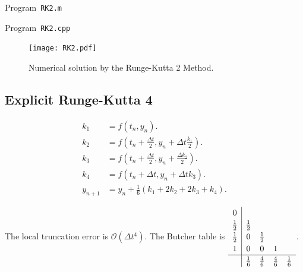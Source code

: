 \begin{listing}[ht!]
	\tiny
	\centering
	\caption{Program~\texttt{RK2.m}}
	\label{code:RK2.m}
\end{listing}

\begin{listing}[ht!]
	\tiny
	\centering
	\caption{Program~\texttt{RK2.cpp}}
	\label{code:RK2.cpp}
\end{listing}

\begin{figure}[ht!]
	\centering
	\texttt{[image: RK2.pdf]}
	\caption{Numerical solution by the Runge-Kutta 2 Method.}
\end{figure}

\subsection{Explicit Runge-Kutta 4}

\begin{align*}
	k_{1}   & =
	f\left(t_{n},y_{n}\right).                                            \\
	k_{2}   & =
	f\left(t_{n}+\frac{\Delta t}{2},y_{n}+\Delta t\frac{k_{1}}{2}\right). \\
	k_{3}   & =
	f\left(t_{n}+\frac{\Delta t}{2},y_{n}+\frac{\Delta k_{2}}{2}\right).  \\
	k_{4}   & =
	f\left(t_{n}+\Delta t,y_{n}+\Delta t k_{3}\right).                    \\
	y_{n+1} & =
	y_{n}+
	\frac{1}{6}\left(k_{1}+2k_{2}+2k_{3}+k_{4}\right).
\end{align*}

The local truncation error is
\begin{math}
	\mathcal{O}
	\left(\Delta t^{4}\right)
\end{math}.
The Butcher table is
\begin{math}
	\renewcommand\arraystretch{1.2}
	\begin{array}
		{c|cccc}
		0           &             &             &             &             \\
		\frac{1}{2} & \frac{1}{2} &             &             &             \\
		\frac{1}{2} & 0           & \frac{1}{2} &             &             \\
		1           & 0           & 0           & 1           &             \\
		\hline
		            & \frac{1}{6} & \frac{4}{6} & \frac{4}{6} & \frac{1}{6}
	\end{array}
\end{math}.

